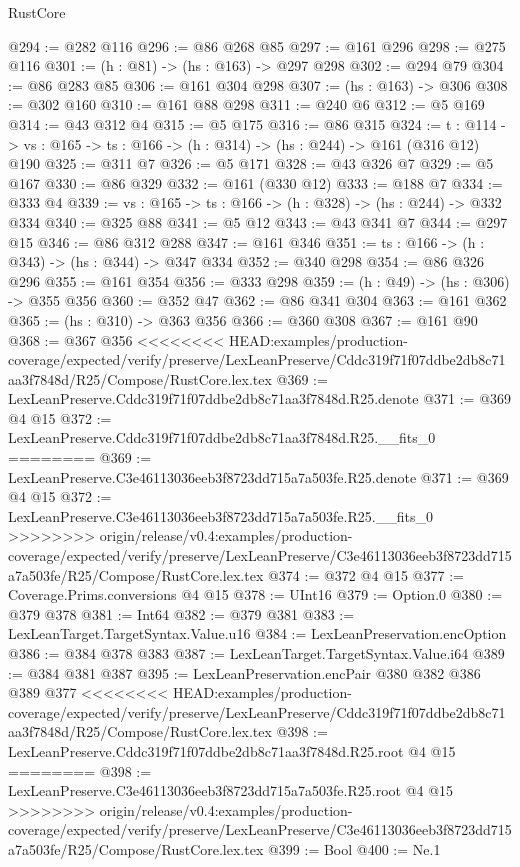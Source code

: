 \begin{lexlean}{RustCore}
\begin{coremodule}
{\begin{coremodule}
@294 := @282 @116
@296 := @86 @268 @85
@297 := @161 @296
@298 := @275 @116
@301 := (h : @81) -> (hs : @163) -> @297 @298
@302 := @294 @79
@304 := @86 @283 @85
@306 := @161 @304 @298
@307 := (hs : @163) -> @306
@308 := @302 @160
@310 := @161 @88 @298
@311 := @240 @6
@312 := @5 @169
@314 := @43 @312 @4
@315 := @5 @175
@316 := @86 @315
@324 := {t : @114} ->
  {vs : @165} -> {ts : @166} -> (h : @314) -> (hs : @244) -> @161 (@316 @12) @190
@325 := @311 @7
@326 := @5 @171
@328 := @43 @326 @7
@329 := @5 @167
@330 := @86 @329
@332 := @161 (@330 @12)
@333 := @188 @7
@334 := @333 @4
@339 := {vs : @165} -> {ts : @166} -> (h : @328) -> (hs : @244) -> @332 @334
@340 := @325 @88
@341 := @5 @12
@343 := @43 @341 @7
@344 := @297 @15
@346 := @86 @312 @288
@347 := @161 @346
@351 := {ts : @166} -> (h : @343) -> (hs : @344) -> @347 @334
@352 := @340 @298
@354 := @86 @326 @296
@355 := @161 @354
@356 := @333 @298
@359 := (h : @49) -> (hs : @306) -> @355 @356
@360 := @352 @47
@362 := @86 @341 @304
@363 := @161 @362
@365 := (hs : @310) -> @363 @356
@366 := @360 @308
@367 := @161 @90
@368 := @367 @356
<<<<<<<< HEAD:examples/production-coverage/expected/verify/preserve/LexLeanPreserve/Cddc319f71f07ddbe2db8c71aa3f7848d/R25/Compose/RustCore.lex.tex
@369 := LexLeanPreserve.Cddc319f71f07ddbe2db8c71aa3f7848d.R25.denote
@371 := @369 @4 @15
@372 := LexLeanPreserve.Cddc319f71f07ddbe2db8c71aa3f7848d.R25.__fits_0
========
@369 := LexLeanPreserve.C3e46113036eeb3f8723dd715a7a503fe.R25.denote
@371 := @369 @4 @15
@372 := LexLeanPreserve.C3e46113036eeb3f8723dd715a7a503fe.R25.__fits_0
>>>>>>>> origin/release/v0.4:examples/production-coverage/expected/verify/preserve/LexLeanPreserve/C3e46113036eeb3f8723dd715a7a503fe/R25/Compose/RustCore.lex.tex
@374 := @372 @4 @15
@377 := Coverage.Prims.conversions @4 @15
@378 := UInt16
@379 := Option.{0}
@380 := @379 @378
@381 := Int64
@382 := @379 @381
@383 := LexLeanTarget.TargetSyntax.Value.u16
@384 := LexLeanPreservation.encOption
@386 := @384 @378 @383
@387 := LexLeanTarget.TargetSyntax.Value.i64
@389 := @384 @381 @387
@395 := LexLeanPreservation.encPair @380 @382 @386 @389 @377
<<<<<<<< HEAD:examples/production-coverage/expected/verify/preserve/LexLeanPreserve/Cddc319f71f07ddbe2db8c71aa3f7848d/R25/Compose/RustCore.lex.tex
@398 := LexLeanPreserve.Cddc319f71f07ddbe2db8c71aa3f7848d.R25.root @4 @15
========
@398 := LexLeanPreserve.C3e46113036eeb3f8723dd715a7a503fe.R25.root @4 @15
>>>>>>>> origin/release/v0.4:examples/production-coverage/expected/verify/preserve/LexLeanPreserve/C3e46113036eeb3f8723dd715a7a503fe/R25/Compose/RustCore.lex.tex
@399 := Bool
@400 := Ne.{1}

\end{coremodule}}
\end{coremodule}
\end{lexlean}
